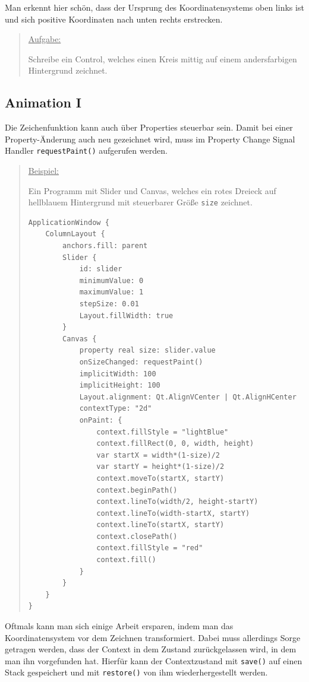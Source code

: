 \documentclass[a4paper]{article}
\begin{document}
Man erkennt hier schön, dass der Ursprung des Koordinatensystems oben links ist und sich positive Koordinaten nach unten rechts erstrecken.

\begin{quote}
\uline{Aufgabe:}

Schreibe ein Control, welches einen Kreis mittig auf einem andersfarbigen Hintergrund zeichnet.
\end{quote}
\subsection{Animation I}
\label{sec-3-2}
Die Zeichenfunktion kann auch über Properties steuerbar sein. Damit bei einer Property-Änderung auch neu gezeichnet wird, muss im Property Change Signal Handler \verb~requestPaint()~ aufgerufen werden.

\begin{quote}
\uline{Beispiel:}

Ein Programm mit Slider und Canvas, welches ein rotes Dreieck auf hellblauem Hintergrund mit steuerbarer Größe \verb~size~ zeichnet.

\begin{verbatim}
ApplicationWindow {
    ColumnLayout {
        anchors.fill: parent
        Slider {
            id: slider
            minimumValue: 0
            maximumValue: 1
            stepSize: 0.01
            Layout.fillWidth: true
        }
        Canvas {
            property real size: slider.value
            onSizeChanged: requestPaint()
            implicitWidth: 100
            implicitHeight: 100
            Layout.alignment: Qt.AlignVCenter | Qt.AlignHCenter
            contextType: "2d"
            onPaint: {
                context.fillStyle = "lightBlue"
                context.fillRect(0, 0, width, height)
                var startX = width*(1-size)/2
                var startY = height*(1-size)/2
                context.moveTo(startX, startY)
                context.beginPath()
                context.lineTo(width/2, height-startY)
                context.lineTo(width-startX, startY)
                context.lineTo(startX, startY)
                context.closePath()
                context.fillStyle = "red"
                context.fill()
            }
        }
    }
}
\end{verbatim}
\end{quote}

Oftmals kann man sich einige Arbeit ersparen, indem man das Koordinatensystem vor dem Zeichnen transformiert. Dabei muss allerdings Sorge getragen werden, dass der Context in dem Zustand zurückgelassen wird, in dem man ihn vorgefunden hat. Hierfür kann der Contextzustand mit \verb~save()~ auf einen Stack gespeichert und mit \verb~restore()~ von ihm wiederhergestellt werden.
\end{document}
